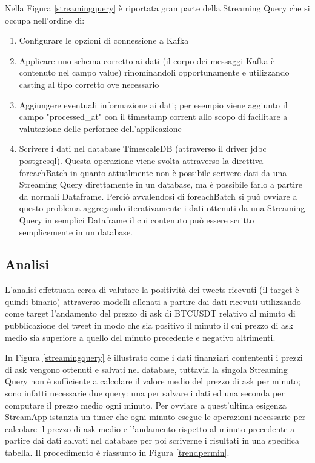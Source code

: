 Nella Figura \ref{streamingquery} è riportata gran parte della Streaming Query che si occupa
nell'ordine di:
\begin{enumerate}
    \item Configurare le opzioni di connessione a Kafka
    \item Applicare uno schema corretto ai dati (il corpo dei messaggi Kafka è contenuto nel campo
    value) rinominandoli opportunamente e utilizzando casting al tipo corretto ove necessario
    \item Aggiungere eventuali informazione ai dati; per esempio viene aggiunto il campo
    "processed\_at" con il timestamp corrent allo scopo di facilitare a valutazione delle perfornce
    dell'applicazione
    \item Scrivere i dati nel database TimescaleDB (attraverso il driver jdbc postgresql). Questa
    operazione viene svolta attraverso la direttiva foreachBatch in quanto attualmente non è
    possibile scrivere dati da una Streaming Query direttamente in un database, ma è possibile farlo a
    partire da normali Dataframe. Perciò avvalendosi di foreachBatch si può ovviare a questo
    problema aggregando iterativamente i dati ottenuti da una Streaming Query in semplici Dataframe
    il cui contenuto può essere scritto semplicemente in un database.

\end{enumerate}

\subsection{Analisi}

L'analisi effettuata cerca di valutare la positività dei tweets ricevuti (il target è quindi
binario) attraverso modelli allenati a partire dai dati ricevuti utilizzando come target
l'andamento del prezzo di ask di BTCUSDT relativo al minuto di pubblicazione del tweet in modo
che sia positivo il minuto il cui prezzo di ask medio sia superiore a quello del minuto
precedente e negativo altrimenti.

In Figura \ref{streamingquery} è illustrato come i dati finanziari contententi i prezzi di ask
vengono ottenuti e salvati nel database, tuttavia la singola Streaming Query non è sufficiente
a calcolare il valore medio del prezzo di ask per minuto; sono infatti necessarie due query: una
per salvare i dati ed una seconda per computare il prezzo medio ogni minuto. Per ovviare a
quest'ultima esigenza StreamApp istanzia un timer che ogni minuto esegue le operazioni necessarie
per calcolare il prezzo di ask medio e l'andamento rispetto al minuto precedente a partire dai
dati salvati nel database per poi scriverne i risultati in una specifica tabella. Il procedimento
è riassunto in Figura \ref{trendpermin}.

